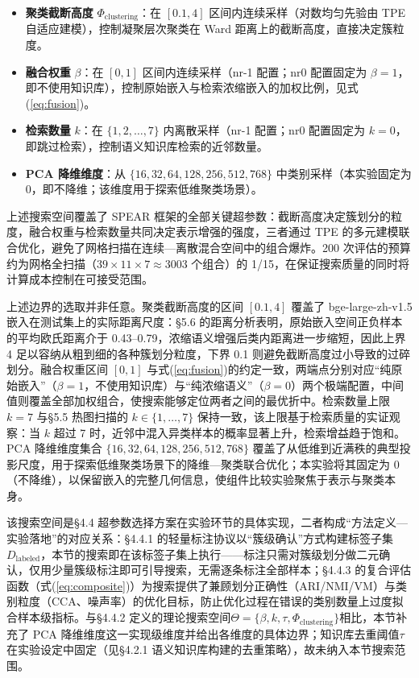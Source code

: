 \documentclass[10.5pt,compsoc,UTF8]{CjC}
\theoremstyle{mystyle}
\begin{document}
\begin{itemize}[leftmargin=1.5em,itemsep=1pt]
  \item \textbf{聚类截断高度} $\Phi_{\text{clustering}}$：在 $[0.1, 4]$ 区间内连续采样（对数均匀先验由 TPE 自适应建模），控制凝聚层次聚类在 Ward 距离上的截断高度，直接决定簇粒度。
  \item \textbf{融合权重} $\beta$：在 $[0, 1]$ 区间内连续采样（nr-1 配置；nr0 配置固定为 $\beta=1$，即不使用知识库），控制原始嵌入与检索浓缩嵌入的加权比例，见式(\ref{eq:fusion})。
  \item \textbf{检索数量} $k$：在 $\{1, 2, \ldots, 7\}$ 内离散采样（nr-1 配置；nr0 配置固定为 $k=0$，即跳过检索），控制语义知识库检索的近邻数量。
  \item \textbf{PCA 降维维度}：从 $\{16, 32, 64, 128, 256, 512, 768\}$ 中类别采样（本实验固定为 0，即不降维；该维度用于探索低维聚类场景）。
\end{itemize}

上述搜索空间覆盖了 SPEAR 框架的全部关键超参数：截断高度决定簇划分的粒度，融合权重与检索数量共同决定表示增强的强度，三者通过 TPE 的多元建模联合优化，避免了网格扫描在连续—离散混合空间中的组合爆炸。200 次评估的预算约为网格全扫描（$39 \times 11 \times 7 \approx 3003$ 个组合）的 1/15，在保证搜索质量的同时将计算成本控制在可接受范围。

上述边界的选取并非任意。聚类截断高度的区间 $[0.1, 4]$ 覆盖了 bge-large-zh-v1.5 嵌入在测试集上的实际距离尺度：\S 5.6 的距离分析表明，原始嵌入空间正负样本的平均欧氏距离介于 0.43--0.79，浓缩语义增强后类内距离进一步缩短，因此上界 4 足以容纳从粗到细的各种簇划分粒度，下界 0.1 则避免截断高度过小导致的过碎划分。融合权重区间 $[0, 1]$ 与式(\ref{eq:fusion})的约定一致，两端点分别对应``纯原始嵌入''（$\beta=1$，不使用知识库）与``纯浓缩语义''（$\beta=0$）两个极端配置，中间值则覆盖全部加权组合，使搜索能够定位两者之间的最优折中。检索数量上限 $k=7$ 与\S 5.5 热图扫描的 $k \in \{1,\ldots,7\}$ 保持一致，该上限基于检索质量的实证观察：当 $k$ 超过 7 时，近邻中混入异类样本的概率显著上升，检索增益趋于饱和。PCA 降维维度集合 $\{16, 32, 64, 128, 256, 512, 768\}$ 覆盖了从低维到近满秩的典型投影尺度，用于探索低维聚类场景下的降维—聚类联合优化；本实验将其固定为 0（不降维），以保留嵌入的完整几何信息，使组件比较实验聚焦于表示与聚类本身。

该搜索空间是\S 4.4 超参数选择方案在实验环节的具体实现，二者构成``方法定义—实验落地''的对应关系：\S 4.4.1 的轻量标注协议以``簇级确认''方式构建标签子集$D_{\text{labeled}}$，本节的搜索即在该标签子集上执行——标注只需对簇级划分做二元确认，仅用少量簇级标注即可引导搜索，无需逐条标注全部样本；\S 4.4.3 的复合评估函数（式(\ref{eq:composite})）为搜索提供了兼顾划分正确性（ARI/NMI/VM）与类别粒度（CCA、噪声率）的优化目标，防止优化过程在错误的类别数量上过度拟合样本级指标。与\S 4.4.2 定义的理论搜索空间$\Theta = \{\beta, k, \tau, \Phi_{\text{clustering}}\}$相比，本节补充了 PCA 降维维度这一实现级维度并给出各维度的具体边界；知识库去重阈值$\tau$在实验设定中固定（见\S 4.2.1 语义知识库构建的去重策略），故未纳入本节搜索范围。
\end{document}

